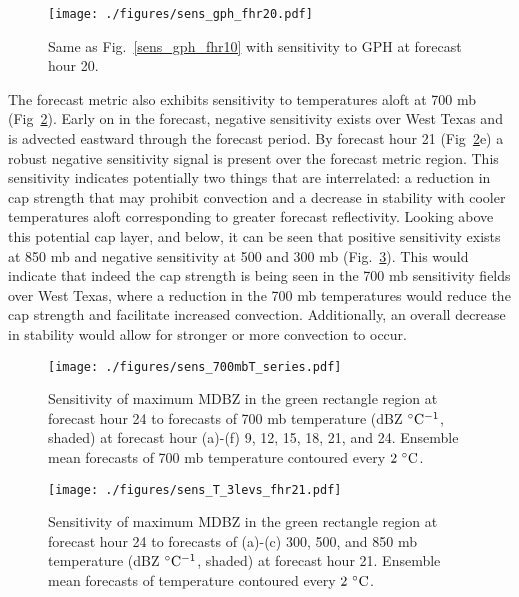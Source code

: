 \documentclass{ttuthes2007}
\newcommand{\tab}{\hspace*{2em}}  %
\begin{document}
\begin{figure}[!tb]
  \centering
  \noindent\texttt{[image: ./figures/sens\_gph\_fhr20.pdf]}\\
  \caption{Same as Fig.~\ref{sens_gph_fhr10} with sensitivity to GPH at forecast hour 20. }
\label{sens_gph_fhr20}
\end{figure}

\tab The forecast metric also exhibits sensitivity to temperatures aloft at 700 mb (Fig~\ref{sens_700mbT_series}). Early on in the forecast, negative sensitivity exists over West Texas and is advected eastward through the forecast period. By forecast hour 21 (Fig~\ref{sens_700mbT_series}e) a robust negative sensitivity signal is present over the forecast metric region. This sensitivity indicates potentially two things that are interrelated: a reduction in cap strength that may prohibit convection and a decrease in stability with cooler temperatures aloft corresponding to greater forecast reflectivity. Looking above this potential cap layer, and below, it can be seen that positive sensitivity exists at 850 mb and negative sensitivity at 500 and 300 mb (Fig.~\ref{sens_T_alllevs_fhr15}). This would indicate that indeed the cap strength is being seen in the 700 mb sensitivity fields over West Texas, where a reduction in the 700 mb temperatures would reduce the cap strength and facilitate increased convection. Additionally, an overall decrease in stability would allow for stronger or more convection to occur. 

\begin{figure}[!tb]
  \centering
  \noindent\texttt{[image: ./figures/sens\_700mbT\_series.pdf]}\\
  \caption{Sensitivity of maximum MDBZ in the green rectangle region at forecast hour 24 to forecasts of 700 mb temperature (dBZ ${}^{\circ} {\rm C^{-1}}$, shaded) at forecast hour (a)-(f) 9, 12, 15, 18, 21, and 24. Ensemble mean forecasts of 700 mb temperature contoured every $2^{~\circ} {\rm C}$. }
\label{sens_700mbT_series}
\end{figure}

\begin{figure}[!b]
  \centering
  \noindent\texttt{[image: ./figures/sens\_T\_3levs\_fhr21.pdf]}\\
  \caption{Sensitivity of maximum MDBZ in the green rectangle region at forecast hour 24 to forecasts of (a)-(c) 300, 500, and 850 mb temperature (dBZ ${}^{\circ} {\rm C^{-1}}$, shaded) at forecast hour 21. Ensemble mean forecasts of temperature contoured every $2^{~\circ} {\rm C}$. }
\label{sens_T_alllevs_fhr15}
\end{figure}
\end{document}
